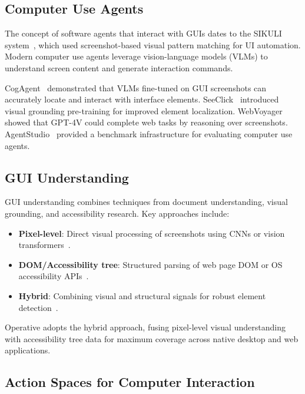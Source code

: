 \documentclass[11pt,twocolumn]{article}
\begin{document}
\subsection{Computer Use Agents}

The concept of software agents that interact with GUIs dates to the SIKULI system~\cite{yeh2009sikuli}, which used screenshot-based visual pattern matching for UI automation. Modern computer use agents leverage vision-language models (VLMs) to understand screen content and generate interaction commands.

CogAgent~\cite{hong2024cogagent} demonstrated that VLMs fine-tuned on GUI screenshots can accurately locate and interact with interface elements. SeeClick~\cite{cheng2024seeclick} introduced visual grounding pre-training for improved element localization. WebVoyager~\cite{he2024webvoyager} showed that GPT-4V could complete web tasks by reasoning over screenshots. AgentStudio~\cite{zheng2024agentstudio} provided a benchmark infrastructure for evaluating computer use agents.

\subsection{GUI Understanding}

GUI understanding combines techniques from document understanding, visual grounding, and accessibility research. Key approaches include:

\begin{itemize}[leftmargin=*]
    \item \textbf{Pixel-level}: Direct visual processing of screenshots using CNNs or vision transformers~\cite{dosovitskiy2020image}.
    \item \textbf{DOM/Accessibility tree}: Structured parsing of web page DOM or OS accessibility APIs~\cite{he2024webvoyager}.
    \item \textbf{Hybrid}: Combining visual and structural signals for robust element detection~\cite{hong2024cogagent}.
\end{itemize}

Operative adopts the hybrid approach, fusing pixel-level visual understanding with accessibility tree data for maximum coverage across native desktop and web applications.

\subsection{Action Spaces for Computer Interaction}
\end{document}
